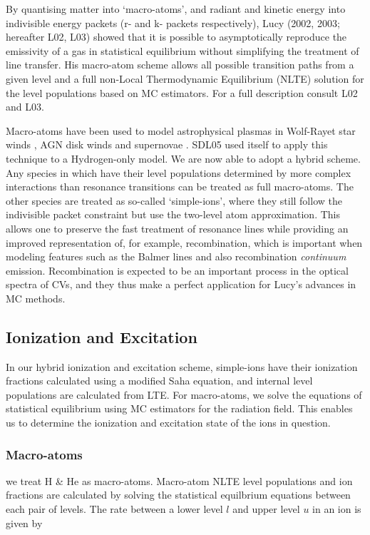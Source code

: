 \documentclass[preprint, a4paper, 11pt]{aastex}
\begin{document}
By quantising matter into `macro-atoms', and radiant and kinetic 
energy into indivisible energy packets (r- and k- packets respectively), 
Lucy (2002, 2003\nocite{lucy2002, lucy2003}; hereafter L02, L03) showed that it is possible 
to asymptotically reproduce the emissivity of a gas in statistical equilibrium 
without simplifying the treatment of line transfer. 
His macro-atom scheme allows all possible transition paths from a given level and a full non-Local 
Thermodynamic Equilibrium (NLTE) solution for the level populations based on MC estimators. 
For a full description consult L02 and L03. 

Macro-atoms have been used to model astrophysical plasmas in 
Wolf-Rayet star winds \citep{sim2004}, AGN disk winds \citep{simlong2008, tatum2012}
and supernovae \citep{kasen2006, kerzendorfsim}.
SDL05 used \py itself to apply this technique to
a Hydrogen-only model. We are now able to adopt a hybrid scheme. 
Any species in which have their level populations determined by
more complex interactions than resonance transitions
can be treated as full macro-atoms. The other species are treated as so-called `simple-ions',
where they still follow the indivisible packet constraint but use the two-level atom approximation.
This allows one to preserve the fast treatment of resonance lines while providing 
an improved representation of, for example, recombination, which is important when modeling features 
such as the Balmer lines and also recombination {\sl continuum} emission. 
Recombination is expected to be an important process in the optical
spectra of CVs, and they thus make a perfect application for Lucy's 
advances in MC methods.


\subsection{Ionization and Excitation}

In our hybrid ionization and excitation scheme, 
simple-ions have their ionization fractions
calculated using a modified Saha equation, and internal level populations are
calculated from LTE. For macro-atoms, we solve the equations of statistical 
equilibrium using MC estimators for the radiation field. This enables us to 
determine the ionization and excitation state of the ions in question.

\subsubsection{Macro-atoms}
we treat H \& He as macro-atoms. 
Macro-atom NLTE level populations and ion fractions are calculated by solving 
the statistical equilbrium equations between each pair of levels. The rate
between a lower level $l$ and upper level $u$ in an ion is given by
\end{document}
